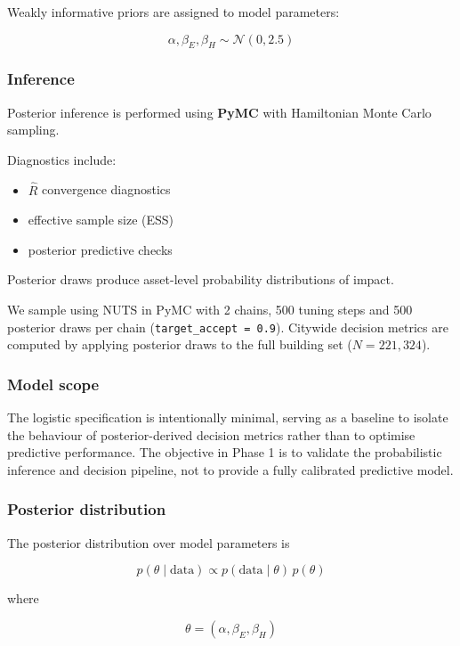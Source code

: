 \documentclass[
]{article}
\providecommand{\tightlist}{%
  \setlength{\itemsep}{0pt}\setlength{\parskip}{0pt}}
\begin{document}
Weakly informative priors are assigned to model parameters:

\[
\alpha, \beta_E, \beta_H \sim \mathcal{N}(0, 2.5)
\]

\subsubsection{Inference}\label{inference}

Posterior inference is performed using \textbf{PyMC} with Hamiltonian
Monte Carlo sampling.

Diagnostics include:

\begin{itemize}
\tightlist
\item
  \(\hat{R}\) convergence diagnostics
\item
  effective sample size (ESS)
\item
  posterior predictive checks
\end{itemize}

Posterior draws produce asset-level probability distributions of impact.

We sample using NUTS in PyMC with 2 chains, 500 tuning steps and 500
posterior draws per chain (\texttt{target\_accept\ =\ 0.9}). Citywide
decision metrics are computed by applying posterior draws to the full
building set (\(N = 221{,}324\)).

\subsubsection{Model scope}\label{model-scope}

The logistic specification is intentionally minimal, serving as a
baseline to isolate the behaviour of posterior-derived decision metrics
rather than to optimise predictive performance. The objective in Phase 1
is to validate the probabilistic inference and decision pipeline, not to
provide a fully calibrated predictive model.

\subsubsection{Posterior distribution}\label{posterior-distribution}

The posterior distribution over model parameters is

\[
p(\theta \mid \text{data})
\propto
p(\text{data} \mid \theta)\,p(\theta)
\]

where

\[
\theta = (\alpha, \beta_E, \beta_H)
\]
\end{document}
